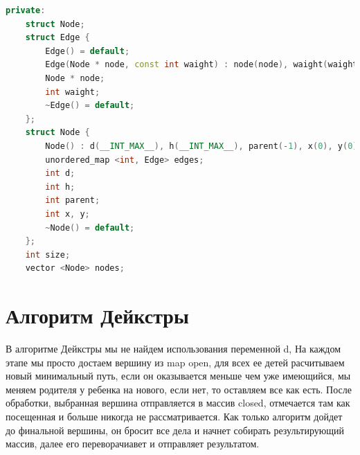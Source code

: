\begin{lstlisting}[language=C++]
private:
    struct Node;
    struct Edge {
        Edge() = default;
        Edge(Node * node, const int waight) : node(node), waight(waight) {}
        Node * node;
        int waight;
        ~Edge() = default;
    };
    struct Node {
        Node() : d(__INT_MAX__), h(__INT_MAX__), parent(-1), x(0), y(0) {}
        unordered_map <int, Edge> edges;
        int d;
        int h;
        int parent;
        int x, y;
        ~Node() = default;
    };
    int size;
    vector <Node> nodes;
\end{lstlisting}

\pagebreak

\section{Алгоритм Дейкстры}

В алгоритме Дейкстры мы не найдем использования переменной d, На каждом этапе мы просто достаем вершину из map open, для всех ее детей расчитываем новый минимальный путь, если он оказывается меньше чем уже имеющийся, мы меняем родителя у ребенка на нового, если нет, то оставляем все как есть. После обработки, выбранная вершина отправляется в массив closed, отмечается там как посещенная и больше никогда не рассматривается. Как только алгоритм дойдет до финальной вершины, он бросит все дела и начнет собирать результирующий массив, далее его переворачиавет и отправляет результатом.

